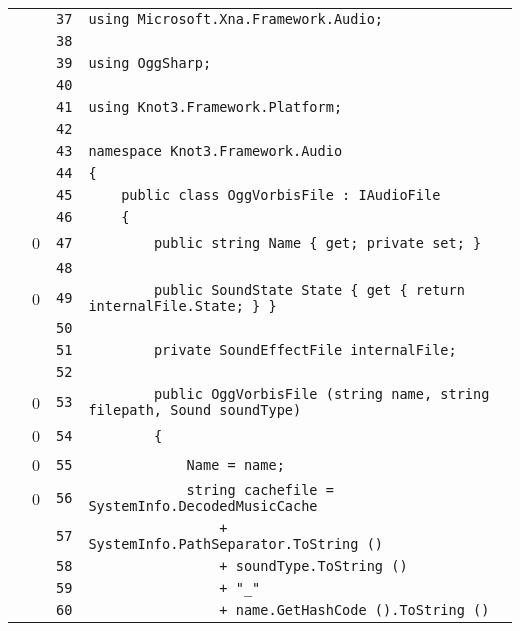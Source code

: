 \documentclass[a4paper,10pt]{article}
\begin{document}
\begin{longtable}[l]{lrrl}
\cellcolor{gray} &  & \verb~37~ & \verb~using Microsoft.Xna.Framework.Audio;~\\
\cellcolor{gray} &  & \verb~38~ & \verb~~\\
\cellcolor{gray} &  & \verb~39~ & \verb~using OggSharp;~\\
\cellcolor{gray} &  & \verb~40~ & \verb~~\\
\cellcolor{gray} &  & \verb~41~ & \verb~using Knot3.Framework.Platform;~\\
\cellcolor{gray} &  & \verb~42~ & \verb~~\\
\cellcolor{gray} &  & \verb~43~ & \verb~namespace Knot3.Framework.Audio~\\
\cellcolor{gray} &  & \verb~44~ & \verb~{~\\
\cellcolor{gray} &  & \verb~45~ & \verb~    public class OggVorbisFile : IAudioFile~\\
\cellcolor{gray} &  & \verb~46~ & \verb~    {~\\
\cellcolor{red} & 0 & \verb~47~ & \verb~        public string Name { get; private set; }~\\
\cellcolor{gray} &  & \verb~48~ & \verb~~\\
\cellcolor{red} & 0 & \verb~49~ & \verb~        public SoundState State { get { return internalFile.State; } }~\\
\cellcolor{gray} &  & \verb~50~ & \verb~~\\
\cellcolor{gray} &  & \verb~51~ & \verb~        private SoundEffectFile internalFile;~\\
\cellcolor{gray} &  & \verb~52~ & \verb~~\\
\cellcolor{red} & 0 & \verb~53~ & \verb~        public OggVorbisFile (string name, string filepath, Sound soundType)~\\
\cellcolor{red} & 0 & \verb~54~ & \verb~        {~\\
\cellcolor{red} & 0 & \verb~55~ & \verb~            Name = name;~\\
\cellcolor{red} & 0 & \verb~56~ & \verb~            string cachefile = SystemInfo.DecodedMusicCache~\\
\cellcolor{gray} &  & \verb~57~ & \verb~                + SystemInfo.PathSeparator.ToString ()~\\
\cellcolor{gray} &  & \verb~58~ & \verb~                + soundType.ToString ()~\\
\cellcolor{gray} &  & \verb~59~ & \verb~                + "_"~\\
\cellcolor{gray} &  & \verb~60~ & \verb~                + name.GetHashCode ().ToString ()~\\

\end{longtable}
\end{document}
